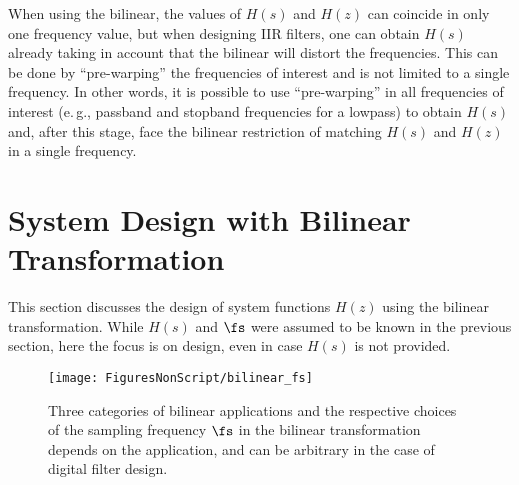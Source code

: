 When using the bilinear, the values of $H(s)$ and $H(z)$ can coincide in only one frequency value, but when designing IIR filters, one can obtain $H(s)$ already taking in account that the bilinear will distort the frequencies. This can be done by ``pre-warping'' the frequencies of interest and is not limited to a single frequency. In other words, it is possible to use ``pre-warping'' in all frequencies of interest (e.\,g., passband and stopband frequencies for a lowpass) to obtain $H(s)$ and, after this stage, face the bilinear restriction of matching $H(s)$ and $H(z)$ in a single frequency.



\section{System Design with Bilinear Transformation}
\label{sec:bilinear_design}

This section discusses the design of system functions $H(z)$ using the bilinear transformation. 
While $H(s)$ and $\fs$ were assumed to be known in the previous section, here 
the focus is on design, even in case $H(s)$ is not provided.

\begin{figure}
\centering
\texttt{[image: FiguresNonScript/bilinear\_fs]}
\caption{Three categories of bilinear applications and the respective choices of the sampling frequency $\fs$ in the bilinear transformation depends on the application, and can be arbitrary in the case of digital filter design.\label{fig:bilinear_fs}}
\end{figure}

